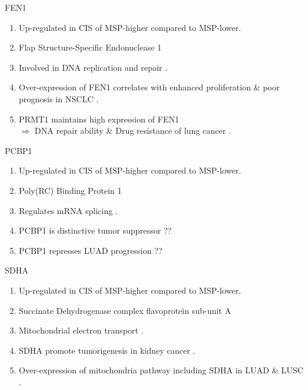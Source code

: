 \documentclass{beamer}
\begin{document}
\begin{frame}[allowframebreaks]
         \begin{block}{FEN1}
            \begin{enumerate}
                \item Up-regulated in CIS of MSP-higher compared to MSP-lower.
                \item Flap Structure-Specific Endonuclease 1
                \item Involved in DNA replication and repair \cite{FEN1-1}.
                \item Over-expression of FEN1 correlates with enhanced proliferation \& poor prognosis in NSCLC \cite{FEN1-2}.
                \item PRMT1 maintains high expression of FEN1 \\
                    $\Rightarrow$ DNA repair ability \& Drug resistance of lung cancer \cite{FEN1-3}.
            \end{enumerate}
        \end{block}

         \begin{block}{PCBP1}
            \begin{enumerate}
                \item Up-regulated in CIS of MSP-higher compared to MSP-lower.
                \item Poly(RC) Binding Protein 1
                \item Regulates mRNA splicing \cite{PCBP1-1}.
                \item PCBP1 is distinctive tumor suppressor \cite{PCBP1-2} ??
                \item PCBP1 represses LUAD progression \cite{PCBP1-3} ??
            \end{enumerate}
        \end{block}

         \begin{block}{SDHA}
            \begin{enumerate}
                \item Up-regulated in CIS of MSP-higher compared to MSP-lower.
                \item Succinate Dehydrogenase complex flavoprotein sub-unit A
                \item Mitochondrial electron transport \cite{SDHA-1}.
                \item SDHA promote tumorigenesis in kidney cancer \cite{SDHA-2}.
                \item Over-expression of mitochondria pathway including SDHA in LUAD \& LUSC \cite{SDHA-3}.
            \end{enumerate}
        \end{block}


\end{frame}
\end{document}

